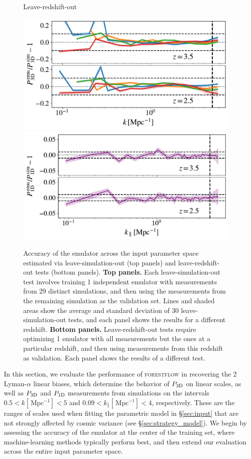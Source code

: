 \documentclass[longauth]{aa}
\newcommand{\poned}{\ensuremath{P_{\rm 1D}}\xspace}
\newcommand{\pthreed}{\ensuremath{P_{\rm 3D}}\xspace}
\newcommand{\forestflow}{\textsc{forestflow}\xspace}
\newcommand{\iMpc}{\ensuremath{\,\mathrm{Mpc}^{-1}}}
\begin{document}
\begin{figure}
\Large{Leave-redshift-out}\par\medskip
\includegraphics[width= 0.95\columnwidth]{figures/l1O_z_P3D.pdf}
\includegraphics[width= 0.96\columnwidth]{figures/l1O_z_P1D.pdf}
\caption{Accuracy of the emulator across the input parameter space estimated via leave-simulation-out (top panels) and leave-redshift-out tests (bottom panels). {\bf Top panels.} Each leave-simulation-out test involves training 1 independent emulator with measurements from 29 distinct simulations, and then using the measurements from the remaining simulation as the validation set. Lines and shaded areas show the average and standard deviation of 30 leave-simulation-out tests, and each panel shows the results for a different redshift. {\bf Bottom panels.} Leave-redshift-out tests require optimizing 1 emulator with all measurements but the ones at a particular redshift, and then using measurements from this redshift as validation. Each panel shows the results of a different test.
}
\label{fig:leave_sim_out}
\end{figure}

In this section, we evaluate the performance of \forestflow in recovering the 2 Lyman-$\alpha$ linear biases, which determine the behavior of \pthreed on linear scales, as well as \pthreed and \poned measurements from simulations on the intervals $0.5<k[\iMpc]<5$ and $0.09<k_\parallel[\iMpc]<4$, respectively. These are the ranges of scales used when fitting the parametric model in \S\ref{sec:input} that are not strongly affected by cosmic variance (see \S\ref{sec:strategy_model}). We begin by assessing the accuracy of the emulator at the center of the training set, where machine-learning methods typically perform best, and then extend our evaluation across the entire input parameter space.
\end{document}
